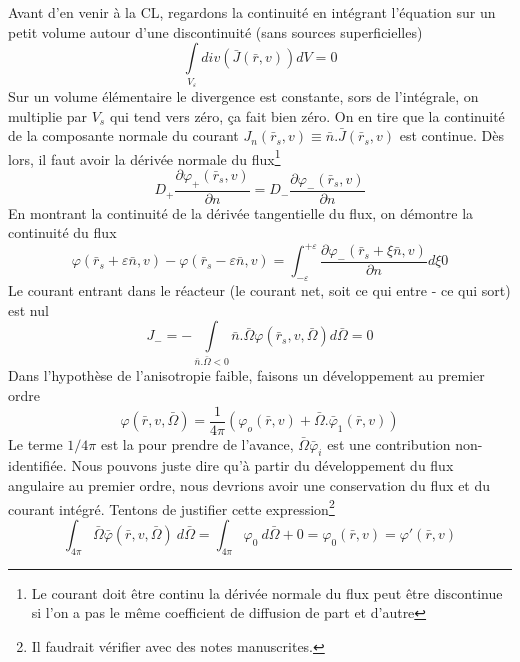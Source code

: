 Avant d'en venir à la CL, regardons la continuité en intégrant l'équation sur un petit volume 
autour d'une discontinuité (sans sources superficielles)
\begin{equation}
\int\limits_{{V_\varepsilon }}   div(\bar J(\bar r,v))dV = 0
\end{equation}
Sur un volume élémentaire le divergence est constante, sors de l'intégrale, on multiplie par $V_s$ 
qui tend vers zéro, ça fait bien zéro. On en tire que la continuité de la composante normale 
du courant ${J_n}({\bar r_s},v) \equiv \bar n.\bar J({\bar r_s},v)$ est continue. Dès lors, il faut 
avoir la dérivée normale du flux\footnote{Le courant doit être continu la dérivée normale du flux
peut être discontinue si l'on a pas le même coefficient de diffusion de part et d'autre}
\begin{equation}
{D_ + }\frac{{\partial {\varphi _ + }({{\bar r}_s},v)}}{{\partial n}} = {D_ - }\frac{{\partial {\varphi _ - }({{\bar r}_s},v)}}{{\partial n}}
\end{equation}
En montrant la continuité de la dérivée tangentielle du flux, on démontre la continuité du flux
\begin{equation}
\varphi ({\bar r_s} + \varepsilon \bar n,v) - \varphi ({\bar r_s} - \varepsilon \bar n,v) = \int_{ - \varepsilon }^{ + \varepsilon }   \frac{{\partial {\varphi _ - }({{\bar r}_s} + \xi \bar n,v)}}{{\partial n}}d\xi 0
\end{equation}
Le courant entrant dans le réacteur (le courant net, soit ce qui entre - ce qui sort) est nul
\begin{equation}
{J_ - } =  - \int\limits_{\bar n.\bar \Omega  < 0}   \bar n.\bar \Omega \varphi ({\bar r_s},v,\bar \Omega )d\bar \Omega  = 0
\end{equation}
Dans l'hypothèse de l'anisotropie faible, faisons un développement au premier ordre 
\begin{equation}
\varphi (\bar r,v,\bar \Omega ) = \frac{1}{{4\pi }}({\varphi _o}(\bar r,v) + \bar \Omega .{\bar \varphi _1}(\bar r,v))
\end{equation}
Le terme $1/4\pi$ est la pour prendre de l'avance, $\bar\Omega\bar\varphi_i$ est une contribution 
non-identifiée. Nous pouvons juste dire qu'à partir du développement du flux angulaire au premier 
ordre, nous devrions avoir une conservation du flux et du courant intégré. Tentons de justifier 
cette expression\footnote{Il faudrait vérifier avec des  notes manuscrites.}
\begin{equation}
\int_{4\pi} \bar\Omega \bar\varphi(\bar r, v,\bar{\Omega})\ d\bar{\Omega} = \int_{4\pi} \varphi_0\ 
d\bar{\Omega} + 0 = \varphi_0(\bar r, v)= \varphi'(\bar r, v)
\end{equation}
